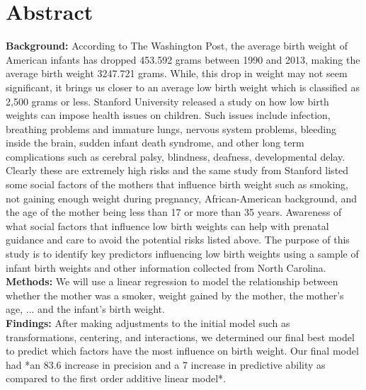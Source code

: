 \documentclass{article}\usepackage[]{graphicx}\usepackage[]{xcolor}
\begin{document}
\section{\textbf{Abstract}}
\textbf{Background:} According to The Washington Post, the average birth weight of American infants has dropped 453.592 grams between 1990 and 2013, making the average birth weight 3247.721 grams. While, this drop in weight may not seem significant, it brings us closer to an average low birth weight which is classified as 2,500 grams or less. Stanford University released a study on how low birth weights can impose health issues on children. Such issues include infection, breathing problems and immature lungs, nervous system problems, bleeding inside the brain, sudden infant death syndrome, and other long term complications such as cerebral palsy, blindness, deafness, developmental delay. Clearly these are extremely high risks and the same study from Stanford listed some social factors of the mothers that influence birth weight such as smoking, 
not gaining enough weight during pregnancy, African-American background,  and the age of the mother being less than 17 or more than 35 years. Awareness of what social factors that influence low birth weights can help with prenatal guidance and care to avoid the potential risks listed above. The purpose of this study is to identify key predictors influencing low birth weights using a sample of infant birth weights and other information collected from North Carolina. \\
\textbf{Methods:} We will use a linear regression to model the relationship between whether the mother was a smoker, weight gained by the mother, the mother's age, ... and the infant's birth weight. \\ \textbf{Findings:} After making adjustments to the initial model such as transformations, centering,  and interactions, we determined our final best model to predict which factors have the most influence on birth weight. Our final model had *an 83.6 increase in precision and a 7 increase in predictive ability as compared to the first order additive linear model*.
\end{document}
